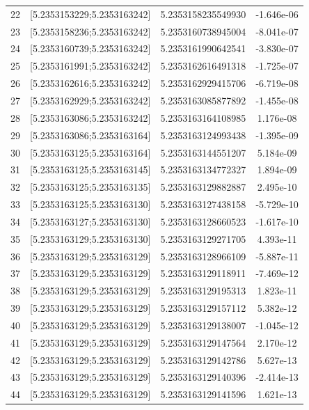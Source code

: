 \documentclass[11pt, oneside]{article}   	%
\begin{document}
\begin{center}
\begin{tabular}{ |c|c|c|c| }
 22 & [5.2353153229;5.2353163242] & 5.2353158235549930 &   -1.646e-06 \\ 
 23 & [5.2353158236;5.2353163242] & 5.2353160738945004 &   -8.041e-07 \\ 
 24 & [5.2353160739;5.2353163242] & 5.2353161990642541 &   -3.830e-07 \\ 
 25 & [5.2353161991;5.2353163242] & 5.2353162616491318 &   -1.725e-07 \\ 
 26 & [5.2353162616;5.2353163242] & 5.2353162929415706 &   -6.719e-08 \\ 
 27 & [5.2353162929;5.2353163242] & 5.2353163085877892 &   -1.455e-08 \\ 
 28 & [5.2353163086;5.2353163242] & 5.2353163164108985 &    1.176e-08 \\ 
 29 & [5.2353163086;5.2353163164] & 5.2353163124993438 &   -1.395e-09 \\ 
 30 & [5.2353163125;5.2353163164] & 5.2353163144551207 &    5.184e-09 \\ 
 31 & [5.2353163125;5.2353163145] & 5.2353163134772327 &    1.894e-09 \\ 
 32 & [5.2353163125;5.2353163135] & 5.2353163129882887 &    2.495e-10 \\ 
 33 & [5.2353163125;5.2353163130] & 5.2353163127438158 &   -5.729e-10 \\ 
 34 & [5.2353163127;5.2353163130] & 5.2353163128660523 &   -1.617e-10 \\ 
 35 & [5.2353163129;5.2353163130] & 5.2353163129271705 &    4.393e-11 \\ 
 36 & [5.2353163129;5.2353163129] & 5.2353163128966109 &   -5.887e-11 \\ 
 37 & [5.2353163129;5.2353163129] & 5.2353163129118911 &   -7.469e-12 \\ 
 38 & [5.2353163129;5.2353163129] & 5.2353163129195313 &    1.823e-11 \\ 
 39 & [5.2353163129;5.2353163129] & 5.2353163129157112 &    5.382e-12 \\ 
 40 & [5.2353163129;5.2353163129] & 5.2353163129138007 &   -1.045e-12 \\ 
 41 & [5.2353163129;5.2353163129] & 5.2353163129147564 &    2.170e-12 \\ 
 42 & [5.2353163129;5.2353163129] & 5.2353163129142786 &    5.627e-13 \\ 
 43 & [5.2353163129;5.2353163129] & 5.2353163129140396 &   -2.414e-13 \\ 
 44 & [5.2353163129;5.2353163129] & 5.2353163129141596 &    1.621e-13 \\ 

\end{tabular}
\end{center}
\end{document}
